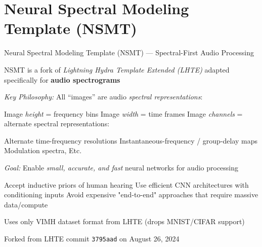 \section[toc={Neural Spectral Modeling}]{Neural Spectral Modeling Template (NSMT)}
  
\begin{emptyslide}[toc={}]{}
\vspace{-1.44em}
\end{emptyslide}

\begin{slide}[\slideopts,toc={NSMT Overview}]{Neural Spectral Modeling Template (NSMT) --- Spectral-First Audio Processing}

  \vspace{-1em}

  \begin{itemize}

    \mpitem NSMT is a fork of \emph{Lightning Hydra Template Extended (LHTE)} adapted specifically for
    \textbf{audio spectrograms}

    \mpitem \emph{Key Philosophy:} All ``images'' are audio \emph{spectral representations}:
    \vspace{-0.5em}
    \begin{itemize}
      \mpitem Image \emph{height} = frequency bins
      \mpitem Image \emph{width} = time frames
      \mpitem Image \emph{channels} = alternate spectral representations:
      \begin{itemize}
        \mpitem Alternate time-frequency resolutions
        \mpitem Instantaneous-frequency / group-delay maps
        \mpitem Modulation spectra, Etc.
      \end{itemize}
    \end{itemize}

    \vspace{-0.5em}
    \mpitem \emph{Goal:} Enable \emph{small, accurate, and fast} neural networks for audio processing
    \vspace{-0.5em}
    \begin{itemize}
      \mpitem Accept inductive priors of human hearing
      \mpitem Use efficient CNN architectures with conditioning inputs
      \mpitem Avoid expensive "end-to-end" approaches that require massive data/compute
    \end{itemize}

    \vspace{-0.5em}
    \mpitem Uses only VIMH dataset format from LHTE (drops MNIST/CIFAR support)
    
    \mpitem Forked from LHTE commit \texttt{3795aad} on August 26, 2024

  \end{itemize}

\end{slide}

